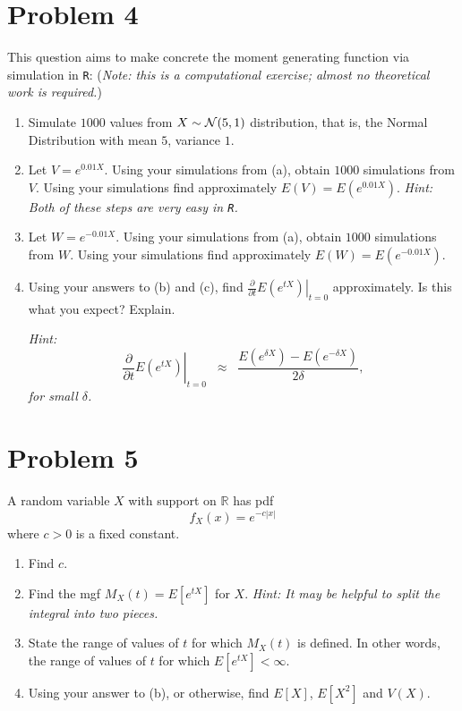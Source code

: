 \documentclass{article}
\newcommand{\1}{\mathbf{1}}
\begin{document}
	
\newpage
\section*{Problem 4}
This question aims to make concrete the moment generating function via simulation in {\tt R}: ({\it Note: this is a computational exercise; almost no theoretical work is required.})
\begin{enumerate}
    \item Simulate $1000$ values from $X \sim {\cal N}(5,1)$ distribution, that is, the Normal Distribution with mean $5$, variance $1$.
    
    
    \item Let $V = e^{0.01 X}$. Using your simulations from (a), obtain $1000$ simulations from $V$. Using your simulations find approximately $E(V) = E(e^{0.01 X})$. {\it Hint: Both of these steps are very easy in {\tt R}.}
    
    
    \item Let $W = e^{-0.01 X}$. Using your simulations from (a), obtain $1000$ simulations from $W$. Using your simulations find approximately $E(W) = E(e^{-0.01 X})$.
    
    
    \item Using your answers to (b) and (c), find $ \left. \frac{\partial}{\partial t} E(e^{tX}) \right|_{t=0}$ approximately. Is this what you expect? Explain.\par
        {\it Hint: 
        $$ \left. \frac{\partial}{\partial t} E(e^{tX}) \right|_{t=0}\;\; \approx\;\; \frac{ E(e^{\delta X}) - E(e^{-\delta X})}{2\delta},$$
        for small $\delta$.}
\end{enumerate}

\newpage
\section*{Problem 5}
A random variable $X$ with support on $\mathbb{R}$ has pdf 
$$ f_X(x) = e^{-c|x|}$$
where $c >0$ is a fixed constant.
\begin{enumerate}
    \item Find $c$.
    \item Find the mgf $M_X(t) = E[e^{tX}]$ for $X$. {\it Hint: It may be helpful to split the integral into two pieces.}
    \item  State the range of values of $t$ for which $M_X(t)$ is defined. In other words, the range of values of $t$ for which $E[e^{tX}] < \infty$.\par
    \item Using your answer to (b), or otherwise, find $E[X]$, $E[X^2]$ and $V(X)$.
\end{enumerate}
\end{document}
